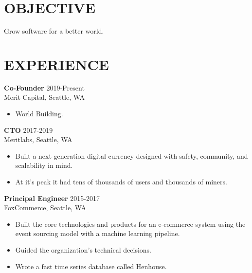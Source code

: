 \documentclass[line,margin]{res}
\begin{document}
\address{{\bf www.mempko.com}}
\address{{\bf max@mempko.com}}

\begin{resume}
 
\section{OBJECTIVE}       
                Grow software for a better world.
 
\section{EXPERIENCE} 
                {\bf Co-Founder} \hfill 2019-Present \\
                Merit Capital, 
                Seattle, WA
                 \begin{itemize}  \itemsep -1pt %
                    \item World Building.
                 \end{itemize}
                {\bf CTO} \hfill 2017-2019 \\
                Meritlabs, 
                Seattle, WA
                 \begin{itemize}  \itemsep -1pt %
                    \item Built a next generation digital currency designed
                        with safety, community, and scalability in mind.
                    \item At it's peak it had tens of thousands of users and thousands of miners.
                 \end{itemize}
                {\bf Principal Engineer} \hfill 2015-2017 \\
                FoxCommerce, 
                Seattle, WA
                 \begin{itemize}  \itemsep -1pt %
                    \item Built the core technologies and products for an e-commerce system 
                        using the event sourcing model with a machine learning pipeline.
                    \item Guided the organization's technical decisions.
                    \item Wrote a fast time series database called Henhouse.
                 \end{itemize}

\end{resume}
\end{document}
